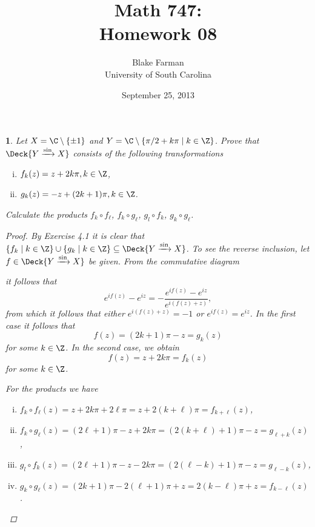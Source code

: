 \documentclass[10pt]{amsart}
\author{Blake Farman\\University of South Carolina}
\title{Math 747:\\Homework 08}
\date{September 25, 2013}
\begin{document}
\maketitle

\providecommand{\p}{\mathfrak{p}}
\providecommand{\m}{\mathfrak{m}}

\newtheorem{thm}{}
\newtheorem{lem}{Lemma}
\newtheorem{prop}{Proposition}
\theoremstyle{definition}
\newtheorem{defn}{Definition}[thm]

\newcommand{\A}{\mathbb{A}}

\begin{thm}
  Let $X = \C \setminus \{\pm 1\}$ and $Y = \C \setminus \left\{\pi/2 + k\pi  \;\middle\vert\; k \in \Z \right\}$.
  Prove that $\Deck{Y \xrightarrow{\sin} X}$ consists of the following transformations
  \begin{enumerate}[(i)]
  \item
    $f_k(z) = z + 2k\pi, k \in \Z$,
  \item
    $g_k(z) = -z + (2k + 1)\pi, k \in \Z$.
  \end{enumerate}
  Calculate the products $f_k \circ f_\ell$, $f_k \circ g_\ell$, $g_l \circ f_k$, $g_k \circ g_\ell$.

  \begin{proof}
    By Exercise 4.1 it is clear that $\left\{f_k \;\middle\vert\; k \in \Z \right\} \cup \left\{g_k \;\middle\vert\; k \in \Z \right\} \subseteq \Deck{Y \xrightarrow{\sin} X}$.
    To see the reverse inclusion, let $f \in \Deck{Y \xrightarrow{\sin} X}$ be given.
    From the commutative diagram
    \begin{center}
    \end{center}
    it follows that
    $$e^{if(z)} - e^{iz} = -\frac{e^{if(z)} - e^{iz}}{e^{i(f(z) + z)}},$$
    from which it follows that either $e^{i(f(z) + z)} = -1$ or $e^{if(z)} = e^{iz}$.
    In the first case it follows that
    $$f(z) = (2k + 1)\pi - z = g_k(z)$$
    for some $k \in \Z$.
    In the second case, we obtain 
    $$f(z) = z + 2k\pi = f_k(z)$$
    for some $k \in \Z$.

    For the products we have
    \begin{enumerate}[(i)]
    \item
      $f_k \circ f_\ell(z) = z + 2k\pi + 2\ell\pi = z + 2(k + \ell)\pi = f_{k + \ell}(z)$, 
    \item
      $f_k \circ g_\ell(z) =  (2\ell + 1)\pi - z + 2k\pi = (2(k + \ell) + 1)\pi - z = g_{\ell + k}(z)$,
    \item
      $g_l \circ f_k(z) = (2\ell + 1)\pi - z - 2k\pi = (2(\ell - k) + 1)\pi - z = g_{\ell - k}(z)$,
    \item
      $g_k \circ g_\ell(z) = (2k + 1)\pi - 2(\ell + 1)\pi + z = 2(k - \ell)\pi + z = f_{k - \ell}(z)$.
    \end{enumerate}
  \end{proof}
\end{thm}
\end{document}
